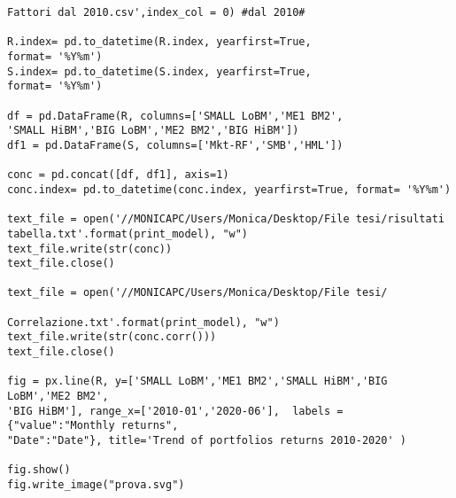 \begin{verbatim}
Fattori dal 2010.csv',index_col = 0) #dal 2010#

R.index= pd.to_datetime(R.index, yearfirst=True, 
format= '%Y%m')
S.index= pd.to_datetime(S.index, yearfirst=True, 
format= '%Y%m')

df = pd.DataFrame(R, columns=['SMALL LoBM','ME1 BM2',
'SMALL HiBM','BIG LoBM','ME2 BM2','BIG HiBM'])
df1 = pd.DataFrame(S, columns=['Mkt-RF','SMB','HML'])

conc = pd.concat([df, df1], axis=1)
conc.index= pd.to_datetime(conc.index, yearfirst=True, format= '%Y%m')

text_file = open('//MONICAPC/Users/Monica/Desktop/File tesi/risultati 
tabella.txt'.format(print_model), "w")
text_file.write(str(conc))
text_file.close()

text_file = open('//MONICAPC/Users/Monica/Desktop/File tesi/

Correlazione.txt'.format(print_model), "w")
text_file.write(str(conc.corr()))
text_file.close()

fig = px.line(R, y=['SMALL LoBM','ME1 BM2','SMALL HiBM','BIG LoBM','ME2 BM2',
'BIG HiBM'], range_x=['2010-01','2020-06'],  labels = {"value":"Monthly returns", 
"Date":"Date"}, title='Trend of portfolios returns 2010-2020' ) 

fig.show()
fig.write_image("prova.svg")

\end{verbatim}

